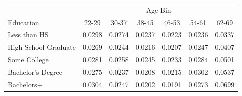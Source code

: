 \begin{tabular}{lcccccc}
\hline\hline
 & \multicolumn{6}{c}{Age Bin} \\
Education & 22-29 & 30-37 & 38-45 & 46-53 & 54-61 & 62-69 \\
\hline
Less than HS&0.0298&0.0274&0.0237&0.0223&0.0236&0.0337\\
High School Graduate&0.0269&0.0244&0.0216&0.0207&0.0247&0.0407\\
Some College&0.0281&0.0258&0.0245&0.0233&0.0284&0.0501\\
Bachelor's Degree&0.0275&0.0237&0.0208&0.0215&0.0302&0.0537\\
Bachelors+&0.0304&0.0247&0.0202&0.0191&0.0273&0.0699\\
\hline\hline
\end{tabular}
